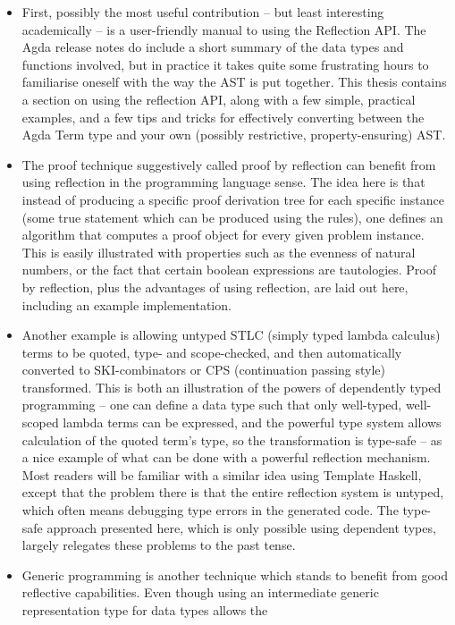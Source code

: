 \begin{itemize}
  \item First, possibly the most useful contribution -- but least
interesting academically -- is a user-friendly manual to using the
Reflection API. The Agda release notes\cite{agda-relnotes-228} do
include a short summary of the data types and functions involved, but
in practice it takes quite some frustrating hours to familiarise
oneself with the way the AST is put together. This thesis contains a
section on using the reflection API, along with a few simple,
practical examples, and a few tips and tricks for effectively
converting between the Agda Term type and your own (possibly
restrictive, property-ensuring) AST.
  \item The proof technique suggestively called proof by reflection
can benefit from using reflection in the programming language
sense. The idea here is that instead of producing a specific proof
derivation tree for each specific instance (some true statement which
can be produced using the rules), one defines an algorithm that computes a proof object for every given problem instance. This is easily illustrated
with properties such as the evenness of natural numbers, or the fact
that certain boolean expressions are tautologies. Proof by reflection,
plus the advantages of using reflection, are laid out here, including
an example implementation.
  \item Another example is allowing untyped STLC (simply typed lambda
calculus) terms to be quoted, type- and scope-checked, and then
automatically converted to SKI-combinators or CPS (continuation
passing style) transformed. This is both an illustration of the powers of
dependently typed programming -- one can define a data type such
that only well-typed, well-scoped lambda terms can be expressed, and the
powerful type system allows calculation of the quoted term's type, so the transformation
is type-safe -- as a
nice example of what can be done with a powerful reflection mechanism. Most
readers will be familiar with a similar idea using Template Haskell, except that
the problem there is that the entire reflection system is untyped, which often
means debugging type errors in the generated code. The type-safe approach presented
here, which is only possible using dependent types, largely relegates these problems
to the past tense.
  \item Generic programming is another technique which stands to
benefit from good reflective capabilities. Even though using an
intermediate generic representation type for data types allows the

\end{itemize}
